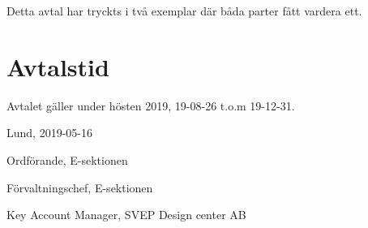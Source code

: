 \documentclass[10pt]{article}
\def\date{2019-05-16} %
\begin{document}
        Detta avtal har tryckts i två exemplar där båda parter fått vardera ett.
        
        \section{Avtalstid}
        Avtalet gäller under hösten 2019, 19-08-26 t.o.m 19-12-31.

        \begin{signatures}{3}
            Lund, \date
            \signature{Edvard Carlsson}{Ordförande, E-sektionen}
            \signature{Henrik Ramström}{Förvaltningschef, E-sektionen}
            \signature{Mikael Hegardt}{Key Account Manager, SVEP Design center AB}
        \end{signatures}
    
\end{document}

